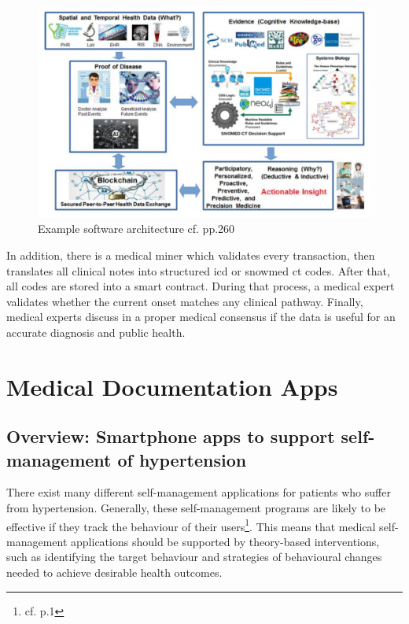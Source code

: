 \begin{figure}[h!]
	\centering
	\includegraphics[width=1\textwidth]{images/example_software_architecture.png}
	\caption{Example software architecture cf.\autocite{talukder} pp.260}
	\label{example_software_architecture}
\end{figure}

In addition, there is a medical miner which validates every transaction, then translates all clinical notes into structured \ac{icd} or \ac{snowmed ct} codes. After that, all codes are stored into a smart contract. During that process, a medical expert validates whether the current onset matches any clinical pathway. 
Finally, medical experts discuss in a proper medical consensus if the data is useful for an accurate diagnosis and public health.

\section{Medical Documentation Apps}

\subsection{Overview: Smartphone apps to support self-management of hypertension}
There exist many different self-management applications for patients who suffer from hypertension. Generally, these self-management programs are likely to be effective if they track the behaviour of their users\footnote{cf.\autocite{alessa} p.1}. This means that medical self-management applications should be supported by theory-based interventions, such as identifying the target behaviour and strategies of behavioural changes needed to achieve desirable health outcomes.
